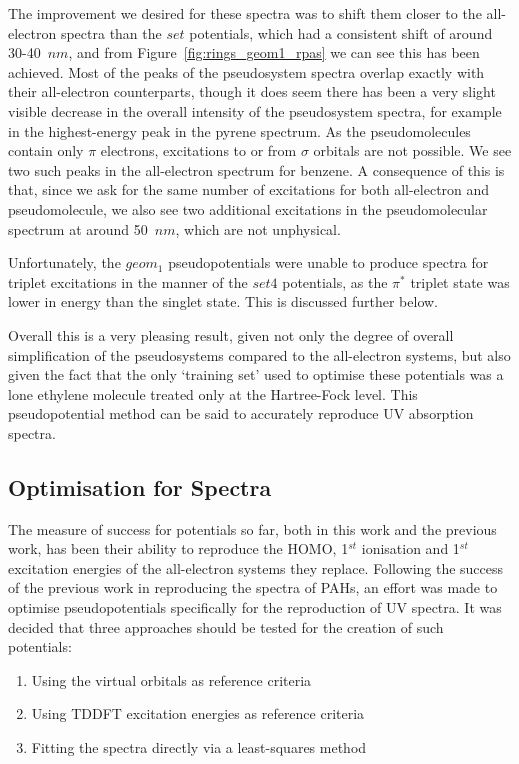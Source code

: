 \documentclass[aip,reprint,nofootinbib]{revtex4-1}
\begin{document}
The improvement we desired for these spectra was to shift them closer to the all-electron spectra than the $set$ potentials, which had a consistent shift of around 30-40~$nm$, and from Figure~\ref{fig:rings_geom1_rpas} we can see this has been achieved. Most of the peaks of the pseudosystem spectra overlap exactly with their all-electron counterparts, though it does seem there has been a very slight visible decrease in the overall intensity of the pseudosystem spectra, for example in the highest-energy peak in the pyrene spectrum. As the pseudomolecules contain only $\pi$ electrons, excitations to or from $\sigma$ orbitals are not possible. We see two such peaks in the all-electron spectrum for benzene. A consequence of this is that, since we ask for the same number of excitations for both all-electron and pseudomolecule, we also see two additional excitations in the pseudomolecular spectrum at around 50~$nm$, which are not unphysical.

Unfortunately, the $geom_1$ pseudopotentials were unable to produce spectra for triplet excitations in the manner of the $set4$ potentials, as the $\pi^{*}$ triplet state was lower in energy than the singlet state. This is discussed further below.

Overall this is a very pleasing result, given not only the degree of overall simplification of the pseudosystems compared to the all-electron systems, but also given the fact that the only `training set' used to optimise these potentials was a lone ethylene molecule treated only at the Hartree-Fock level. This pseudopotential method can be said to accurately reproduce UV absorption spectra.

\subsection{Optimisation for Spectra}
\label{sec:spectralopt}

The measure of success for potentials so far, both in this work and the previous work, has been their ability to reproduce the HOMO, 1$^{st}$ ionisation and 1$^{st}$ excitation energies of the all-electron systems they replace. Following the success of the previous work in reproducing the spectra of PAHs, an effort was made to optimise pseudopotentials specifically for the reproduction of UV spectra. It was decided that three approaches should be tested for the creation of such potentials:

\begin{enumerate}
\item Using the virtual orbitals as reference criteria
\item Using TDDFT excitation energies as reference criteria
\item Fitting the spectra directly via a least-squares method
\end{enumerate}
\end{document}
